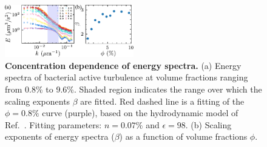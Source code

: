 \documentclass[twocolumn,aps,prl,amsmath,amssymb,longbibliography]{revtex4-2}
\begin{document}
\begin{figure}[!]
\begin{center}\includegraphics[width=0.5\textwidth]{Figures/energy-spectra/v1.pdf}
\caption[Concentration dependence of energy spectra.]
{
\textbf{Concentration dependence of energy spectra.}
(a) Energy spectra of bacterial active turbulence at volume fractions ranging from 0.8\% to 9.6\%. Shaded region indicates the range over which the scaling exponents $\beta$ are fitted. Red dashed line is a fitting of the $\phi=0.8\%$ curve (purple), based on the hydrodynamic model of Ref.~\cite{Bardfalvy2019}. Fitting parameters: $n=0.07\%$ and $\epsilon=98$.
(b) Scaling exponents of energy spectra ($\beta$) as a function of volume fractions $\phi$.
}
\label{fig:energy-spectra}
\end{center}
\end{figure}
\end{document}
